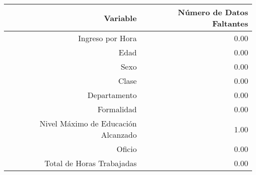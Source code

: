 \begin{table}[ht]
\centering
\begin{tabular}{rr}
  \hline Variable
 & Número de Datos Faltantes \\ 
  \hline
  Ingreso por Hora & 0.00 \\ 
  Edad & 0.00 \\ 
  Sexo & 0.00 \\ 
  Clase & 0.00 \\ 
  Departamento & 0.00 \\ 
  Formalidad & 0.00 \\ 
  Nivel Máximo de Educación Alcanzado & 1.00 \\ 
  Oficio & 0.00 \\
  Total de Horas Trabajadas & 0.00 \\ 
   \hline
\end{tabular}
\end{table}
